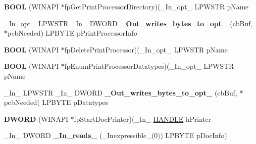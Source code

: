 \begin{DoxyCompactItemize}
\item 
\mbox{\label{struct___p_r_i_n_t_p_r_o_v_i_d_o_r_a8ee27162ccb0b155630183daaa0d9d08}} 
{\bfseries B\+O\+OL} (W\+I\+N\+A\+PI $\ast$fp\+Get\+Print\+Processor\+Directory)(\+\_\+\+In\+\_\+opt\+\_\+ L\+P\+W\+S\+TR p\+Name
\item 
\mbox{\label{struct___p_r_i_n_t_p_r_o_v_i_d_o_r_a2b7f096505eafb7b112d2c57876fb384}} 
\+\_\+\+In\+\_\+opt\+\_\+ L\+P\+W\+S\+TR \+\_\+\+In\+\_\+ D\+W\+O\+RD {\bfseries \+\_\+\+Out\+\_\+writes\+\_\+bytes\+\_\+to\+\_\+opt\+\_\+} (cb\+Buf, $\ast$pcb\+Needed) L\+P\+B\+Y\+TE p\+Print\+Processor\+Info
\item 
\mbox{\label{struct___p_r_i_n_t_p_r_o_v_i_d_o_r_afe89d1d8683c5bc23783d2976b111477}} 
{\bfseries B\+O\+OL} (W\+I\+N\+A\+PI $\ast$fp\+Delete\+Print\+Processor)(\+\_\+\+In\+\_\+opt\+\_\+ L\+P\+W\+S\+TR p\+Name
\item 
\mbox{\label{struct___p_r_i_n_t_p_r_o_v_i_d_o_r_add76474463e6aaf441b5242f00c87c23}} 
{\bfseries B\+O\+OL} (W\+I\+N\+A\+PI $\ast$fp\+Enum\+Print\+Processor\+Datatypes)(\+\_\+\+In\+\_\+opt\+\_\+ L\+P\+W\+S\+TR p\+Name
\item 
\mbox{\label{struct___p_r_i_n_t_p_r_o_v_i_d_o_r_afb5dcec10907050c701cb2680148b8f7}} 
\+\_\+\+In\+\_\+ L\+P\+W\+S\+TR \+\_\+\+In\+\_\+ D\+W\+O\+RD {\bfseries \+\_\+\+Out\+\_\+writes\+\_\+bytes\+\_\+to\+\_\+opt\+\_\+} (cb\+Buf, $\ast$pcb\+Needed) L\+P\+B\+Y\+TE p\+Datatypes
\item 
\mbox{\label{struct___p_r_i_n_t_p_r_o_v_i_d_o_r_a69faa269c1135cf0bd53c55b5834ed3d}} 
{\bfseries D\+W\+O\+RD} (W\+I\+N\+A\+PI $\ast$fp\+Start\+Doc\+Printer)(\+\_\+\+In\+\_\+ \hyperlink{interfacevoid}{H\+A\+N\+D\+LE} h\+Printer
\item 
\mbox{\label{struct___p_r_i_n_t_p_r_o_v_i_d_o_r_ac75ee9edfdd54914b74138cec91121ce}} 
\+\_\+\+In\+\_\+ D\+W\+O\+RD {\bfseries \+\_\+\+In\+\_\+reads\+\_\+} (\+\_\+\+Inexpressible\+\_\+(0)) L\+P\+B\+Y\+TE p\+Doc\+Info)
\item 
\mbox{\label{struct___p_r_i_n_t_p_r_o_v_i_d_o_r_ae5be9b6744bf5033573008d25516a389}} 

\end{DoxyCompactItemize}
